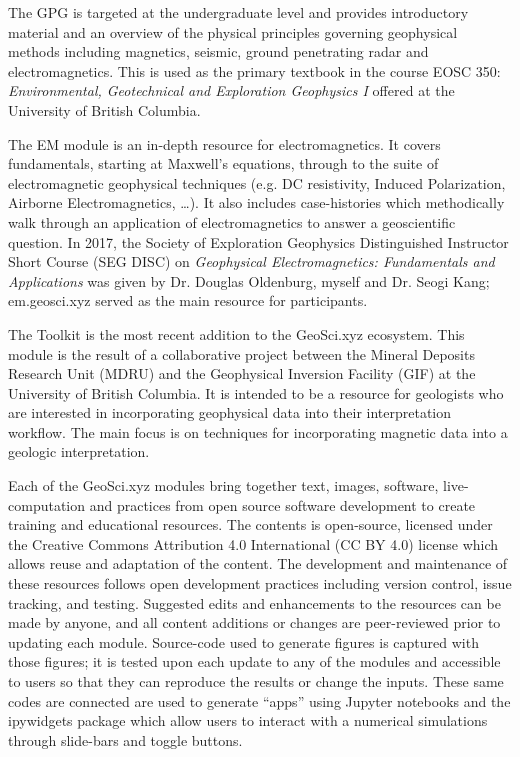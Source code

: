 The GPG is targeted at the undergraduate level and provides introductory material and an overview of the physical principles governing geophysical methods including magnetics, seismic, ground penetrating radar and electromagnetics. This is used as the primary textbook in the course EOSC 350: \emph{Environmental, Geotechnical and Exploration Geophysics I} offered at the University of British Columbia.

The EM module is an in-depth resource for electromagnetics. It covers fundamentals, starting at Maxwell's equations, through to the suite of electromagnetic geophysical techniques (e.g. DC resistivity, Induced Polarization, Airborne Electromagnetics, …). It also includes case-histories which methodically walk through an application of electromagnetics to answer a geoscientific question. In 2017, the Society of Exploration Geophysics Distinguished Instructor Short Course (SEG DISC) on \emph{Geophysical Electromagnetics: Fundamentals and Applications} was given by Dr. Douglas Oldenburg, myself and Dr. Seogi Kang; em.geosci.xyz served as the main resource for participants.

The Toolkit is the most recent addition to the GeoSci.xyz ecosystem. This module is the result of a collaborative project between the Mineral Deposits Research Unit (MDRU) and the Geophysical Inversion Facility (GIF) at the University of British Columbia. It is intended to be a resource for geologists who are interested in incorporating geophysical data into their interpretation workflow. The main focus is on techniques for incorporating magnetic data into a geologic interpretation.

Each of the GeoSci.xyz modules bring together text, images, software, live-computation and practices from open source software development to create training and educational resources. The contents is open-source, licensed under the Creative Commons Attribution 4.0 International (CC BY 4.0) license which allows reuse and adaptation of the content. The development and maintenance of these resources follows open development practices including version control, issue tracking, and testing. Suggested edits and enhancements to the resources can be made by anyone, and all content additions or changes are peer-reviewed prior to updating each module. Source-code used to generate figures is captured with those figures; it is tested upon each update to any of the modules and accessible to users so that they can reproduce the results or change the inputs. These same codes are connected are used to generate ``apps'' using Jupyter notebooks and the ipywidgets package which allow users to interact with a numerical simulations through slide-bars and toggle buttons.

